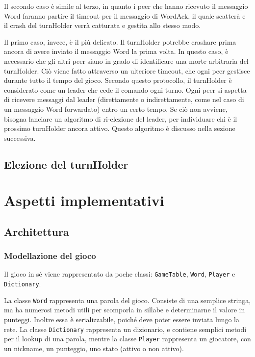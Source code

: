 \documentclass[10.5pt]{article}
\begin{document}
Il secondo caso è simile al terzo, in quanto i peer che hanno ricevuto il messaggio Word faranno partire il timeout per il messaggio di WordAck, il quale scatterà e il crash del turnHolder verrà catturata e gestita allo stesso modo.

Il primo caso, invece, è il più delicato. Il turnHolder potrebbe crashare prima ancora di avere inviato il messaggio Word la prima volta. In questo caso, è necessario che gli altri peer siano in grado di identificare una morte arbitraria del turnHolder. Ciò viene fatto attraverso un ulteriore timeout, che ogni peer gestisce durante tutto il tempo del gioco. Secondo questo protocollo, il turnHolder è considerato come un leader che cede il comando ogni turno. Ogni peer si aspetta di ricevere messaggi dal leader (direttamente o indirettamente, come nel caso di un messaggio Word forwardato) entro un certo tempo. Se ciò non avviene, bisogna lanciare un algoritmo di ri-elezione del leader, per individuare chi è il prossimo turnHolder ancora attivo. Questo algoritmo è discusso nella sezione successiva.



\subsection{Elezione del turnHolder}



\section{Aspetti implementativi}

\subsection{Architettura}

\subsubsection{Modellazione del gioco}

Il gioco in sé viene rappresentato da poche classi: \texttt{GameTable}, \texttt{Word}, \texttt{Player} e \texttt{Dictionary}.

La classe \texttt{Word} rappresenta una parola del gioco. Consiste di una semplice stringa, ma ha numerosi metodi utili per scomporla in sillabe e determinarne il valore in punteggi. Inoltre essa è serializzabile, poiché deve poter essere inviata lungo la rete. La classe \texttt{Dictionary} rappresenta un dizionario, e contiene semplici metodi per il lookup di una parola, mentre la classe \texttt{Player} rappresenta un giocatore, con un nickname, un punteggio, uno stato (attivo o non attivo).
\end{document}
